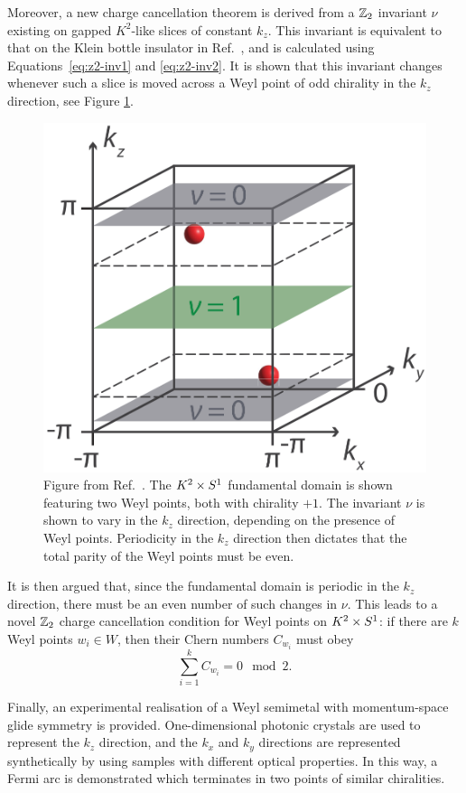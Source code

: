 Moreover, a new charge cancellation theorem is derived from a $\mathbb{Z}_2$ invariant $\nu$ existing on gapped $K^2$-like slices of constant $k_z$. This invariant is equivalent to that on the Klein bottle insulator in Ref.~\cite{CYZ_Klein-gauge}, and is calculated using Equations~\eqref{eq:z2-inv1} and \eqref{eq:z2-inv2}. It is shown that this invariant changes whenever such a slice is moved across a Weyl point of odd chirality in the $k_z$ direction, see Figure \ref{fig:Z2-cancellation}.
\begin{figure}[htb!]
	\centering
	\includegraphics[width=.5\linewidth]{Images/Z2-cancellation}
	\caption{Figure from Ref.~\cite{Fonseca-Vaidya_nonorientable}. The $K^2\times S^1$ fundamental domain is shown featuring two Weyl points, both with chirality $+1$. The invariant $\nu$ is shown to vary in the $k_z$ direction, depending on the presence of Weyl points. Periodicity in the $k_z$ direction then dictates that the total parity of the Weyl points must be even.}
	\label{fig:Z2-cancellation}
\end{figure}
It is then argued that, since the fundamental domain is periodic in the $k_z$ direction, there must be an even number of such changes in $\nu$. This leads to a novel $\mathbb{Z}_2$ charge cancellation condition for Weyl points on $K^2\times S^1$: if there are $k$ Weyl points $w_i\in W$, then their Chern numbers $C_{w_i}$ must obey
\begin{equation}\label{eq:Z2-cancellation}
	\sum_{i=1}^{k}C_{w_i} = 0 \mod 2.
\end{equation}

Finally, an experimental realisation of a Weyl semimetal with momentum-space glide symmetry is provided. One-dimensional photonic crystals are used to represent the $k_z$ direction, and the $k_x$ and $k_y$ directions are represented synthetically by using samples with different optical properties. %
In this way, a Fermi arc is demonstrated which terminates in two points of similar chiralities.

